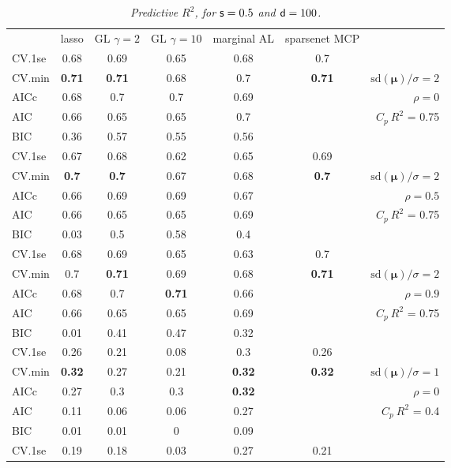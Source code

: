 \documentclass[12pt]{article}
\newcommand{\mr}[1]{\mathrm{#1}}
\newcommand{\bm}[1]{\mathbf{#1}}
\begin{document}
\begin{table}[p]\vspace{-.5cm}
\caption[l]{\label{r2}\it Predictive $R^2$, for ${\sf s}=0.5$ and  ${\sf d}=100$.}
\vspace{-.5cm}
\small{}
\begin{center}
\begin{tabular}{l*{5}{c}|r}
 & lasso & GL $\gamma=2$ & GL $\gamma=10$ & marginal AL & sparsenet MCP  &  \\
\cline{1-7}
CV.1se & 0.68 & 0.69 & 0.65 & 0.68 & 0.7 &\\
CV.min & {\bf 0.71} & {\bf 0.71} & 0.68 & 0.7 & {\bf 0.71} &  $\mr{sd}(\bm{\mu})/\sigma=2$ \\
AICc & 0.68 & 0.7 & 0.7 & 0.69 & & $\rho=0$ \\
AIC & 0.66 & 0.65 & 0.65 & 0.7 & & \multirow{2}{*}{$C_p ~ R^2$ = 0.75} \\
BIC & 0.36 & 0.57 & 0.55 & 0.56 & & \\
 \hline 
CV.1se & 0.67 & 0.68 & 0.62 & 0.65 & 0.69 &\\
CV.min & {\bf 0.7} & {\bf 0.7} & 0.67 & 0.68 & {\bf 0.7} &  $\mr{sd}(\bm{\mu})/\sigma=2$ \\
AICc & 0.66 & 0.69 & 0.69 & 0.67 & & $\rho=0.5$ \\
AIC & 0.66 & 0.65 & 0.65 & 0.69 & & \multirow{2}{*}{$C_p ~ R^2$ = 0.75} \\
BIC & 0.03 & 0.5 & 0.58 & 0.4 & & \\
 \hline 
CV.1se & 0.68 & 0.69 & 0.65 & 0.63 & 0.7 &\\
CV.min & 0.7 & {\bf 0.71} & 0.69 & 0.68 & {\bf 0.71} &  $\mr{sd}(\bm{\mu})/\sigma=2$ \\
AICc & 0.68 & 0.7 & {\bf 0.71} & 0.66 & & $\rho=0.9$ \\
AIC & 0.66 & 0.65 & 0.65 & 0.69 & & \multirow{2}{*}{$C_p ~ R^2$ = 0.75} \\
BIC & 0.01 & 0.41 & 0.47 & 0.32 & & \\
 \hline 
CV.1se & 0.26 & 0.21 & 0.08 & 0.3 & 0.26 &\\
CV.min & {\bf 0.32} & 0.27 & 0.21 & {\bf 0.32} & {\bf 0.32} &  $\mr{sd}(\bm{\mu})/\sigma=1$ \\
AICc & 0.27 & 0.3 & 0.3 & {\bf 0.32} & & $\rho=0$ \\
AIC & 0.11 & 0.06 & 0.06 & 0.27 & & \multirow{2}{*}{$C_p ~ R^2$ = 0.4} \\
BIC & 0.01 & 0.01 & 0 & 0.09 & & \\
 \hline 
CV.1se & 0.19 & 0.18 & 0.03 & 0.27 & 0.21 &\\

\end{tabular}
\end{center}
\end{table}
\end{document}
